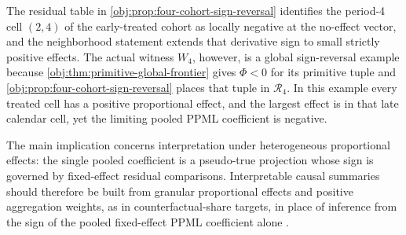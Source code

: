 The residual table in \cref{obj:prop:four-cohort-sign-reversal} identifies the period-4 cell \((2,4)\) of the early-treated cohort as locally negative at the no-effect vector, and the neighborhood statement extends that derivative sign to small strictly positive effects. The actual witness \(W_4\), however, is a global sign-reversal example because \cref{obj:thm:primitive-global-frontier} gives \(\Phi<0\) for its primitive tuple and \cref{obj:prop:four-cohort-sign-reversal} places that tuple in \(\mathcal R_4\). In this example every treated cell has a positive proportional effect, and the largest effect is in that late calendar cell, yet the limiting pooled PPML coefficient is negative.

The main implication concerns interpretation under heterogeneous proportional effects: the single pooled coefficient is a pseudo-true projection whose sign is governed by fixed-effect residual comparisons. Interpretable causal summaries should therefore be built from granular proportional effects and positive aggregation weights, as in counterfactual-share targets, in place of inference from the sign of the pooled fixed-effect PPML coefficient alone \citep{MoreauKastler2025PTT,Wooldridge2023NonlinearDiD,RothSantAnna2023}.
